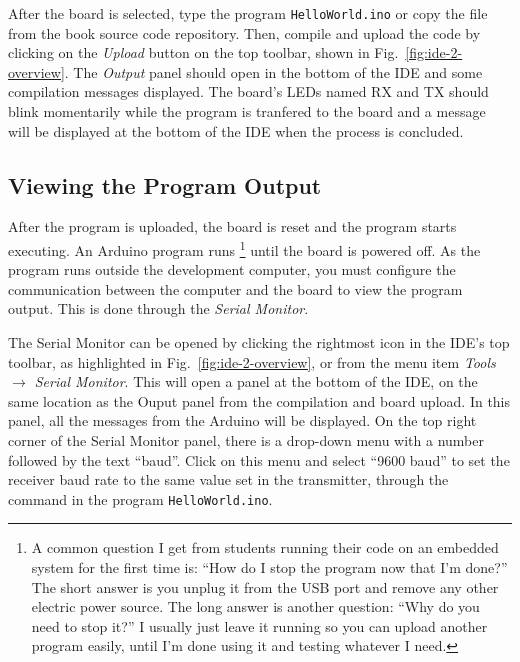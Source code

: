 After the board is selected, type the program \texttt{HelloWorld.ino} or copy the file from the book source code repository.
Then, compile and upload the code by clicking on the \emph{Upload} button on the top toolbar, shown in Fig.~\ref{fig:ide-2-overview}.
The \emph{Output} panel should open in the bottom of the IDE and some compilation messages displayed.
The board's LEDs named RX and TX should blink momentarily while the program is tranfered to the board and a message will be displayed at the bottom of the IDE when the process is concluded.

\subsection{Viewing the Program Output}
After the program is uploaded, the board is reset and the program starts executing.
An Arduino program runs%
\footnote{%
  A common question I get from students running their code on an embedded system for the first time is: ``How do I stop the program now that I'm done?''
  The short answer is you unplug it from the USB port and remove any other electric power source.
  The long answer is another question: ``Why do you need to stop it?'' I usually just leave it running so you can upload another program easily, until I'm done using it and testing whatever I need.%
}
until the board is powered off.
As the program runs outside the development computer, you must configure the communication between the computer and the board to view the program output.
This is done through the \emph{Serial Monitor}.

The Serial Monitor can be opened by clicking the rightmost icon in the IDE's top toolbar, as highlighted in Fig.~\ref{fig:ide-2-overview}, or from the menu item \emph{Tools $\to$ Serial Monitor}.
This will open a panel at the bottom of the IDE, on the same location as the Ouput panel from the compilation and board upload.
In this panel, all the messages from the Arduino will be displayed.
On the top right corner of the Serial Monitor panel, there is a drop-down menu with a number followed by the text ``baud''.
Click on this menu and select ``9600 baud'' to set the receiver baud rate to the same value set in the transmitter, through the command  in the program \texttt{HelloWorld.ino}.

